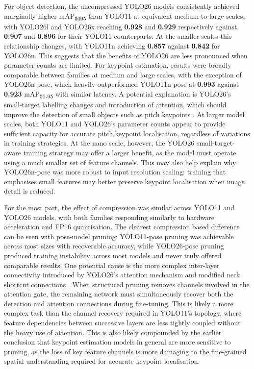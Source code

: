 For object detection, the uncompressed YOLO26 models consistently achieved marginally higher mAP\textsubscript{50\text{-}95} than YOLO11 at equivalent medium-to-large scales, with YOLO26l and YOLO26x reaching \textbf{0.928} and \textbf{0.929} respectively against \textbf{0.907} and \textbf{0.896} for their YOLO11 counterparts. At the smaller scales this relationship changes, with YOLO11n achieving \textbf{0.857} against \textbf{0.842} for YOLO26n. This suggests that the benefits of YOLO26 are less pronounced when parameter counts are limited. For keypoint estimation, results were broadly comparable between families at medium and large scales, with the exception of YOLO26n-pose, which heavily outperformed YOLO11n-pose at \textbf{0.993} against \textbf{0.923} mAP\textsubscript{50-95} with similar latency. A potential explanation is YOLO26's small-target labelling changes and introduction of attention, which should improve the detection of small objects such as pitch keypoints \cite{UltralyticsYOLO}. At larger model scales, both YOLO11 and YOLO26's parameter counts appear to provide sufficient capacity for accurate pitch keypoint localisation, regardless of variations in training strategies. At the nano scale, however, the YOLO26 small-target-aware training strategy may offer a larger benefit, as the model must operate using a much smaller set of feature channels. This may also help explain why YOLO26n-pose was more robust to input resolution scaling: training that emphasises small features may better preserve keypoint localisation when image detail is reduced.

For the most part, the effect of compression was similar across YOLO11 and YOLO26 models, with both families responding similarly to hardware acceleration and FP16 quantisation. The clearest compression based difference can be seen with pose-model pruning: YOLO11-pose pruning was achievable across most sizes with recoverable accuracy, while YOLO26-pose pruning produced training instability across most models and never truly offered comparable results. One potential cause is the more complex inter-layer connectivity introduced by YOLO26's attention mechanism and modified neck shortcut connections \cite{UltralyticsYOLO}. When structured pruning removes channels involved in the attention gate, the remaining network must simultaneously recover both the detection and attention connections during fine-tuning. This is likely a more complex task than the channel recovery required in YOLO11's topology, where feature dependencies between successive layers are less tightly coupled without the heavy use of attention. This is also likely compounded by the earlier conclusion that keypoint estimation models in general are more sensitive to pruning, as the loss of key feature channels is more damaging to the fine-grained spatial understanding required for accurate keypoint localisation.

